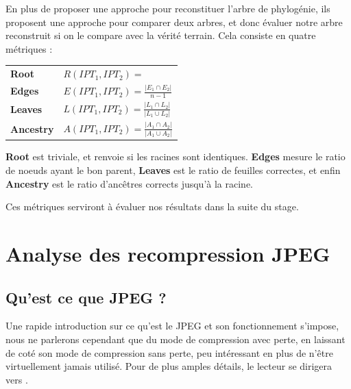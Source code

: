 \documentclass[utf8]{stageM2R} %
\begin{document}
En plus de proposer une approche pour reconstituer l'arbre de phylogénie, ils proposent une approche pour comparer deux arbres, et donc évaluer notre arbre reconstruit si on le compare avec la vérité terrain. Cela consiste en quatre métriques : \\
\renewcommand{\arraystretch}{2}
\begin{tabular}{ll}
  \textbf{Root} & $
                  R(IPT_{1}, IPT_{2}) = $
                  \scalebox{0.65}{%
                  $
                  \begin{cases}
                    1 & if\ \texttt{Root(IPT}_{1}) = \texttt{Root(IPT}_{2}) \\
                    0 & Otherwise
                  \end{cases}
                        $} \\
  \textbf{Edges} & $E(IPT_{1}, IPT_{2}) = \frac{|E_{1} \cap E_{2}|} {n - 1}$ \\
  \textbf{Leaves} & $L(IPT_{1}, IPT_{2}) = \frac{|L_{1} \cap L_{2}|} {|L_{1} \cup L_{2}|}$ \\
  \textbf{Ancestry} & $A(IPT_{1}, IPT_{2}) = \frac{|A_{1} \cap A_{2}|} {|A_{1} \cup A_{2}|}$
\end{tabular}
\renewcommand{\arraystretch}{1.}
\vspace{5mm}

\textbf{Root} est triviale, et renvoie si les racines sont identiques. \textbf{Edges} mesure le ratio de noeuds ayant le bon parent, \textbf{Leaves} est le ratio de feuilles correctes, et enfin \textbf{Ancestry} est le ratio d'ancêtres corrects jusqu'à la racine.

Ces métriques serviront à évaluer nos résultats dans la suite du stage.

\section{Analyse des recompression JPEG}
\subsection{Qu'est ce que JPEG ?}
Une rapide introduction sur ce qu'est le JPEG et son fonctionnement s'impose, nous ne parlerons cependant que du mode de compression avec perte, en laissant de coté son mode de compression sans perte, peu intéressant en plus de n'être virtuellement jamais utilisé. Pour de plus amples détails, le lecteur se dirigera vers \cite{wallace1992jpeg}.
\end{document}
